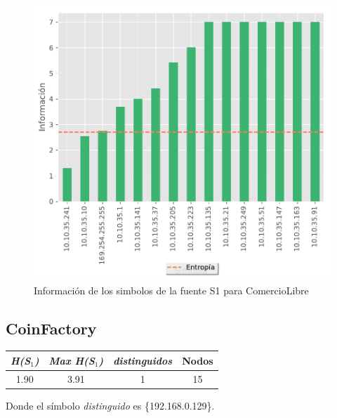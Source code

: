\begin{figure}[htb]
	\centering
	
\end{figure}


\begin{figure}
  \begin{center}
    \includegraphics[scale = 0.5]{img/ECommerce-information-S1.pdf}
    \caption{Información de los simbolos de la fuente S1 para ComercioLibre}
    \label{informacion_ecommerce}
  \end{center}
\end{figure}

\subsection*{\textbf{CoinFactory}}

\begin{center}\small
	\begin{tabular}{ c | c | c | c }
	  \textit{H(S$_1$)} & \textit{Max H(S$_1$)} & \textbar \textit{distinguidos}\textbar & \textbar Nodos\textbar \\
	  \hline
	  1.90 & 3.91 & 1 & 15 \\
	\end{tabular}
\end{center}
Donde el símbolo \textit{distinguido} es \{192.168.0.129\}.

